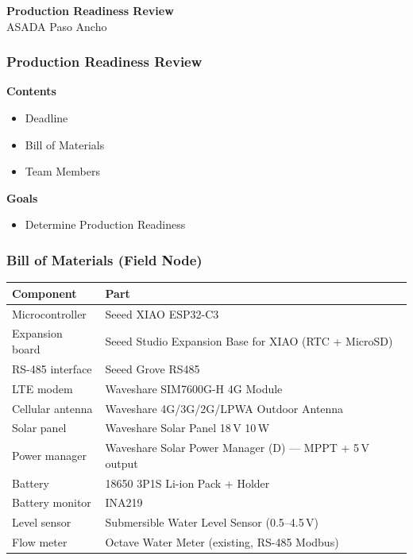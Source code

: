 \documentclass[aspectratio=169]{beamer}
\begin{document}
\begin{frame}
    \begin{center}
        {\LARGE \textbf{Production Readiness Review}} \\
        \vspace{0.5cm}
        {ASADA Paso Ancho} \\
        \vspace{0.25cm}
    \end{center}
\end{frame}

\begin{frame}
    \frametitle{Production Readiness Review}

    {\textbf{Contents}}
    \begin{itemize}
        \item Deadline
        \item Bill of Materials
        \item Team Members
    \end{itemize}
    \vspace{0.25cm}
    {\textbf{Goals}}
    \begin{itemize}
        \item Determine Production Readiness
    \end{itemize}
\end{frame}

\begin{frame}
    \frametitle{Bill of Materials (Field Node)}

    \footnotesize
    \begin{tabularx}{\textwidth}{l X}
        \toprule
        Component & Part \\
        \midrule
        Microcontroller    & Seeed XIAO ESP32-C3 \\
        Expansion board    & Seeed Studio Expansion Base for XIAO (RTC + MicroSD) \\
        RS-485 interface   & Seeed Grove RS485 \\
        LTE modem          & Waveshare SIM7600G-H 4G Module \\
        Cellular antenna   & Waveshare 4G/3G/2G/LPWA Outdoor Antenna \\
        Solar panel        & Waveshare Solar Panel 18\,V 10\,W \\
        Power manager      & Waveshare Solar Power Manager (D) --- MPPT + 5\,V output \\
        Battery            & 18650 3P1S Li-ion Pack + Holder \\
        Battery monitor    & INA219 \\
        Level sensor       & Submersible Water Level Sensor (0.5--4.5\,V) \\
        Flow meter         & Octave Water Meter (existing, RS-485 Modbus) \\
        \bottomrule
    \end{tabularx}
\end{frame}
\end{document}
